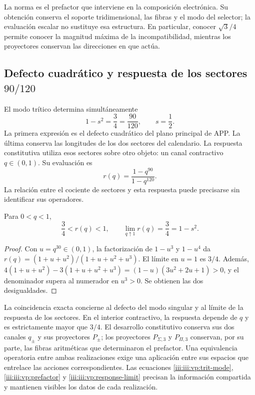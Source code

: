 La norma es el prefactor que interviene en la composición electrónica.
Su obtención conserva el soporte tridimensional, las fibras y el modo
del selector; la evaluación escalar no sustituye esa estructura. En
particular, conocer $\sqrt3/4$ permite conocer la magnitud máxima de
la incompatibilidad, mientras los proyectores conservan las direcciones
en que actúa.

\clearpage
\subsection{Defecto cuadrático y respuesta de los sectores \(90/120\)}

El modo trítico determina simultáneamente
\begin{equation}
 1-s^2=\frac34=\frac{90}{120},\qquad s=\frac12.
 \label{iii:iii:vp:defect-ratio}
\end{equation}
La primera expresión es el defecto cuadrático del plano principal de APP.
La última conserva las longitudes de los dos sectores del calendario.
La respuesta constitutiva utiliza esos sectores sobre otro objeto: un
canal contractivo $q\in(0,1)$. Su evaluación es
\[
 r(q)=\frac{1-q^{90}}{1-q^{120}}.
\]
La relación entre el cociente de sectores y esta respuesta puede
precisarse sin identificar sus operadores.

\begin{proposition}
Para $0<q<1$,
\begin{equation}
 \frac34<r(q)<1,\qquad
 \lim_{q\uparrow1}r(q)=\frac34=1-s^2.
 \label{iii:iii:vp:response-limit}
\end{equation}
\end{proposition}
\begin{proof}
Con $u=q^{30}\in(0,1)$, la factorización de $1-u^3$ y
$1-u^4$ da
$r(q)=(1+u+u^2)/(1+u+u^2+u^3)$. El límite en $u=1$ es
$3/4$. Además,
$4(1+u+u^2)-3(1+u+u^2+u^3)
=(1-u)(3u^2+2u+1)>0$, y el denominador supera al numerador
en $u^3>0$. Se obtienen las dos desigualdades.
\end{proof}

La coincidencia exacta concierne al defecto del modo singular y al límite
de la respuesta de los sectores. En el interior contractivo, la respuesta
depende de $q$ y es estrictamente mayor que $3/4$. El desarrollo
constitutivo conserva sus dos canales $q_\pm$ y sus proyectores
$P_\pm$; los proyectores $P_{\Sigma,3}$ y $P_{\Pi,3}$ conservan,
por su parte, las fibras aritméticas que determinaron el prefactor.
Una equivalencia operatoria entre ambas realizaciones exige una aplicación
entre sus espacios que entrelace las acciones correspondientes.
Las ecuaciones \eqref{iii:iii:vp:trit-mode}, \eqref{iii:iii:vp:prefactor} y
\eqref{iii:iii:vp:response-limit} precisan la información compartida y
mantienen visibles los datos de cada realización.
